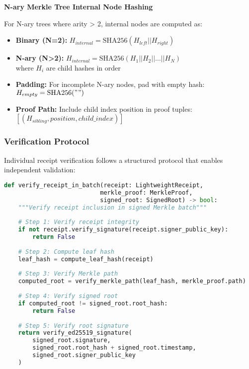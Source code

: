 \documentclass[12pt,a4paper]{article}
\begin{document}
\begin{technicalbox}
\textbf{N-ary Merkle Tree Internal Node Hashing}

For N-ary trees where arity > 2, internal nodes are computed as:
\begin{itemize}
\item \textbf{Binary (N=2):} $H_{internal} = \text{SHA256}(H_{left} || H_{right})$
\item \textbf{N-ary (N>2):} $H_{internal} = \text{SHA256}(H_1 || H_2 || \ldots || H_N)$ \\
where $H_i$ are child hashes in order
\item \textbf{Padding:} For incomplete N-ary nodes, pad with empty hash: $H_{empty} = \text{SHA256}("")$ 
\item \textbf{Proof Path:} Include child index position in proof tuples: \\
$[(H_{sibling}, position, child\_index)]$
\end{itemize}
\end{technicalbox}

\subsubsection{Verification Protocol}

Individual receipt verification follows a structured protocol that enables independent validation:

\begin{lstlisting}[language=Python, caption=Merkle Verification Protocol]
def verify_receipt_in_batch(receipt: LightweightReceipt, 
                           merkle_proof: MerkleProof,
                           signed_root: SignedRoot) -> bool:
    """Verify receipt inclusion in signed Merkle batch"""
    
    # Step 1: Verify receipt integrity
    if not receipt.verify_signature(receipt.signer_public_key):
        return False
    
    # Step 2: Compute leaf hash
    leaf_hash = compute_leaf_hash(receipt)
    
    # Step 3: Verify Merkle path
    computed_root = verify_merkle_path(leaf_hash, merkle_proof.path)
    
    # Step 4: Verify signed root
    if computed_root != signed_root.root_hash:
        return False
        
    # Step 5: Verify root signature
    return verify_ed25519_signature(
        signed_root.signature,
        signed_root.root_hash + signed_root.timestamp,
        signed_root.signer_public_key
    )
\end{lstlisting}
\end{document}

